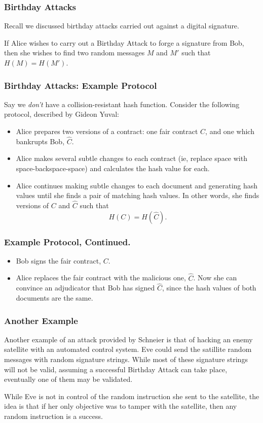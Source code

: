 \documentclass{beamer}
\newcommand{\<}{\langle}
\renewcommand{\>}{\rangle}
\begin{document}
\begin{frame}
\frametitle{Birthday Attacks}
Recall  we discussed birthday attacks carried out against a digital signature.\newline

If Alice wishes to carry out a Birthday Attack to forge a signature from Bob, then she wishes to find two random messages $M$ and $M'$ such that $H(M) = H(M')$.
\end{frame}

\begin{frame}
\frametitle{Birthday Attacks: Example Protocol}

Say we \emph{don't} have a collision-resistant hash function. Consider the following protocol, described by Gideon Yuval:
\begin{itemize}
\item Alice prepares two versions of a contract: one fair contract $C$, and one which bankrupts Bob, $\hat C$.
\item Alice makes several subtle changes to each contract (ie, replace space with space-backspace-space) and calculates the hash value for each. 
\item Alice continues making subtle changes to each document and generating hash values until she finds a pair of matching hash values. In other words, she finds versions of $C$ and $\hat C$ such that
\[
H(C) = H(\hat C).
\]
\end{itemize}
\end{frame}


\begin{frame}
\frametitle{Example Protocol, Continued.}

\begin{itemize}
\item Bob signs the fair contract, $C$.
\item Alice replaces the fair contract with the malicious one, $\hat C$. Now she can convince an adjudicator that Bob has signed $\hat C$, since the hash values of both documents are the same. 
\end{itemize}
\end{frame}


\begin{frame}
\frametitle{Another Example}

Another example of an attack provided by Schneier is that of hacking an enemy satellite with an automated control system. Eve could send the satillite random messages with random signature strings. While most of these signature strings will not be valid, assuming a successful Birthday Attack can take place, eventually one of them may be validated. \newline

While Eve is not in control of the random instruction she sent to the satellite, the idea is that if her only objective was to tamper with the satellite, then any random instruction is a success. 
\end{frame}
\end{document}

